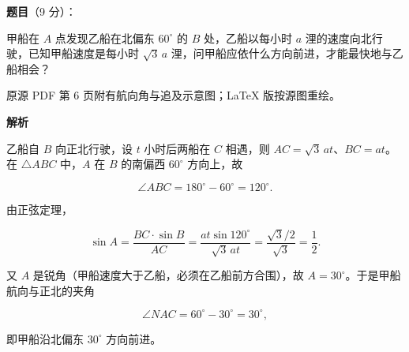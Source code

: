 \begin{answer}

\textbf{题目}（9 分）：

甲船在 $A$ 点发现乙船在北偏东 $60^\circ$ 的 $B$ 处，乙船以每小时 $a$ 浬的速度向北行驶，已知甲船速度是每小时 $\sqrt3\,a$ 浬，问甲船应依什么方向前进，才能最快地与乙船相会？

\begin{gktip}
原源 PDF 第 6 页附有航向角与追及示意图；LaTeX 版按源图重绘。
\end{gktip}
\nopagebreak[4]
\begin{center}\end{center}
\nopagebreak[4]
\textbf{解析}

乙船自 $B$ 向正北行驶，设 $t$ 小时后两船在 $C$ 相遇，则 $AC=\sqrt3\,at$、$BC=at$。在 $\triangle ABC$ 中，$A$ 在 $B$ 的南偏西 $60^\circ$ 方向上，故

\nopagebreak[4]
\[
\angle ABC=180^\circ-60^\circ=120^\circ.
\]

由正弦定理，

\nopagebreak[4]
\[
\sin A=\frac{BC\cdot\sin B}{AC}
=\frac{at\sin120^\circ}{\sqrt3\,at}
=\frac{\sqrt3/2}{\sqrt3}
=\frac12.
\]

又 $A$ 是锐角（甲船速度大于乙船，必须在乙船前方合围），故 $A=30^\circ$。于是甲船航向与正北的夹角

\nopagebreak[4]
\[
\angle NAC=60^\circ-30^\circ=30^\circ,
\]

即甲船沿北偏东 $30^\circ$ 方向前进。
\nopagebreak[4]
\begin{center}\end{center}
\nopagebreak[4]

\end{answer}
